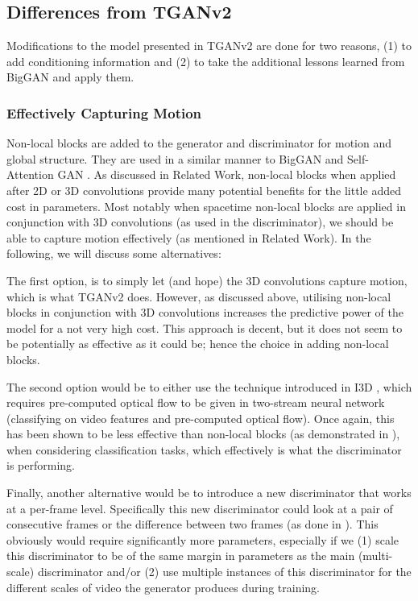 \documentclass{report}
\theoremstyle{plain}
\theoremstyle{definition}
\theoremstyle{remark}
\numberwithin{equation}{section}
\numberwithin{figure}{section}
\newcommand{\<}{\langle}
\renewcommand{\>}{\rangle}
\begin{document}
\subsection{Differences from TGANv2}

Modifications to the model presented in TGANv2 \cite{saito_tganv2:_2018} are done for two reasons, (1) to add conditioning information and (2) to take the additional lessons learned from BigGAN \cite{brock_large_2018} and apply them.

\subsubsection{Effectively Capturing Motion}

Non-local blocks \cite{wang_non-local_2017} are added to the generator and discriminator for motion and global structure. They are used in a similar manner to BigGAN \cite{brock_large_2018} and Self-Attention GAN \cite{zhang_self-attention_2018}. As discussed in Related Work, non-local blocks when applied after 2D or 3D convolutions provide many potential benefits for the little added cost in parameters. Most notably when spacetime non-local blocks are applied in conjunction with 3D convolutions (as used in the discriminator), we should be able to capture motion effectively (as mentioned in Related Work). In the following, we will discuss some alternatives:

The first option, is to simply let (and hope) the 3D convolutions capture motion, which is what TGANv2 does. However, as discussed above, utilising non-local blocks in conjunction with 3D convolutions increases the predictive power of the model for a not very high cost. This approach is decent, but it does not seem to be potentially as effective as it could be; hence the choice in adding non-local blocks.

The second option would be to either use the technique introduced in I3D \cite{carreira_quo_2017}, which requires pre-computed optical flow to be given in two-stream neural network (classifying on video features and pre-computed optical flow). Once again, this has been shown to be less effective than non-local blocks (as demonstrated in \cite{wang_non-local_2017}), when considering classification tasks, which effectively is what the discriminator is performing. 

Finally, another alternative would be to introduce a new discriminator that works at a per-frame level. Specifically this new discriminator could look at a pair of consecutive frames or the difference between two frames (as done in \cite{pan_create_2018}). This obviously would require significantly more parameters, especially if we (1) scale this discriminator to be of the same margin in parameters as the main (multi-scale) discriminator and/or (2) use multiple instances of this discriminator for the different scales of video the generator produces during training.
\end{document}
